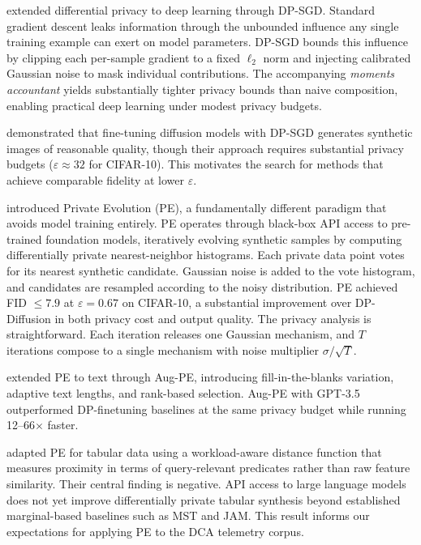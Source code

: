 \documentclass[12pt,letterpaper]{article}
\renewcommand{\_}{\textunderscore\allowbreak}
\begin{document}
\citet{abadi2016deep} extended differential privacy to deep learning through DP-SGD. Standard gradient descent leaks information through the unbounded influence any single training example can exert on model parameters. DP-SGD bounds this influence by clipping each per-sample gradient to a fixed $\ell_2$ norm and injecting calibrated Gaussian noise to mask individual contributions. The accompanying \textit{moments accountant} yields substantially tighter privacy bounds than naive composition, enabling practical deep learning under modest privacy budgets.

\citet{ghalebikesabi2023differentially} demonstrated that fine-tuning diffusion models with DP-SGD generates synthetic images of reasonable quality, though their approach requires substantial privacy budgets ($\varepsilon \approx 32$ for CIFAR-10). This motivates the search for methods that achieve comparable fidelity at lower $\varepsilon$.

\citet{lin2025differentiallyprivatesyntheticdata} introduced Private Evolution (PE), a fundamentally different paradigm that avoids model training entirely. PE operates through black-box API access to pre-trained foundation models, iteratively evolving synthetic samples by computing differentially private nearest-neighbor histograms. Each private data point votes for its nearest synthetic candidate. Gaussian noise is added to the vote histogram, and candidates are resampled according to the noisy distribution. PE achieved FID $\leq 7.9$ at $\varepsilon = 0.67$ on CIFAR-10, a substantial improvement over DP-Diffusion in both privacy cost and output quality. The privacy analysis is straightforward. Each iteration releases one Gaussian mechanism, and $T$ iterations compose to a single mechanism with noise multiplier $\sigma / \sqrt{T}$.

\citet{xie2024differentiallyprivatesyntheticdata} extended PE to text through Aug-PE, introducing fill-in-the-blanks variation, adaptive text lengths, and rank-based selection. Aug-PE with GPT-3.5 outperformed DP-finetuning baselines at the same privacy budget while running 12--66$\times$ faster.

\citet{swanberg2025apiaccessllmsuseful} adapted PE for tabular data using a workload-aware distance function that measures proximity in terms of query-relevant predicates rather than raw feature similarity. Their central finding is negative. API access to large language models does not yet improve differentially private tabular synthesis beyond established marginal-based baselines such as MST and JAM. This result informs our expectations for applying PE to the DCA telemetry corpus.
\end{document}
